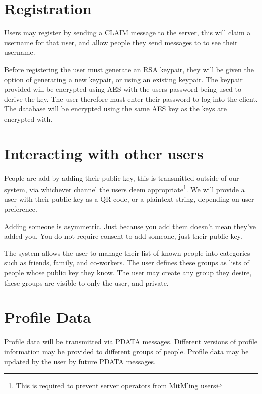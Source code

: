 
\section{Registration}
Users may register by sending a CLAIM message to the server, this will claim a
username for that user, and allow people they send messages to to see their
username.

Before registering the user must generate an RSA keypair, they will be given the
option of generating a new keypair, or using an existing keypair. The keypair
provided will be encrypted using AES with the users password being used to
derive the key. The user therefore must enter their password to log into the
client. The database will be encrypted using the same AES key as the keys are
encrypted with.

\section{Interacting with other users}
People are add by adding their public key, this is transmitted outside of our
system, via whichever channel the users deem appropriate\footnote{This is
required to prevent server operators from MitM'ing users}. We will provide a
user with their public key as a QR code, or a plaintext string, depending on
user preference.

Adding someone is asymmetric. Just because you add them doesn't mean they've
added you. You do not require consent to add someone, just their public key.
    
The system allows the user to manage their list of known people into categories
such as friends, family, and co-workers. The user defines these groups as lists
of people whose public key they know. The user may create any group they desire,
these groups are visible to only the user, and private.

\section{Profile Data}
Profile data will be transmitted via PDATA messages. Different versions of
profile information may be provided to different groups of people. Profile data
may be updated by the user by future PDATA messages.

